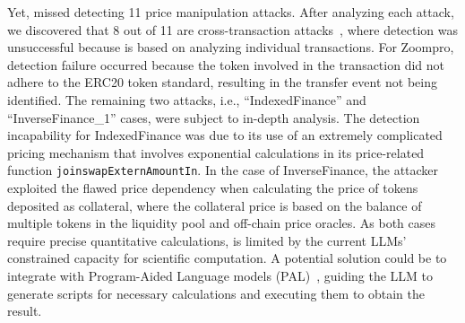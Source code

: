 Yet, \tool missed detecting 11 price manipulation attacks. After analyzing each attack, we discovered that 8 out of 11 are cross-transaction attacks~\cite{ATK,Inuko,ARK,Inverse,SanshuInu,StarWallets,SwapX,Vesperfinance}, where detection was unsuccessful because \tool is based on analyzing individual transactions. For Zoompro, detection failure occurred because the token involved in the transaction did not adhere to the ERC20 token standard, resulting in the transfer event not being identified. The remaining two attacks, i.e., ``IndexedFinance'' and ``InverseFinance\_1'' cases, were subject to in-depth analysis.
The detection incapability for IndexedFinance was due to its use of an extremely complicated pricing mechanism that involves exponential calculations in its price-related function \texttt{joinswapExternAmountIn}. In the case of InverseFinance, the attacker exploited the flawed price dependency when calculating the price of tokens deposited as collateral, where the collateral price is based on the balance of multiple tokens in the liquidity pool and off-chain price oracles. As both cases require precise quantitative calculations, \tool is limited by the current LLMs' constrained capacity for scientific computation. A potential solution could be to integrate with Program-Aided Language models (PAL)~\cite{gao2023pal}, guiding the LLM to generate scripts for necessary calculations and executing them to obtain the result.


